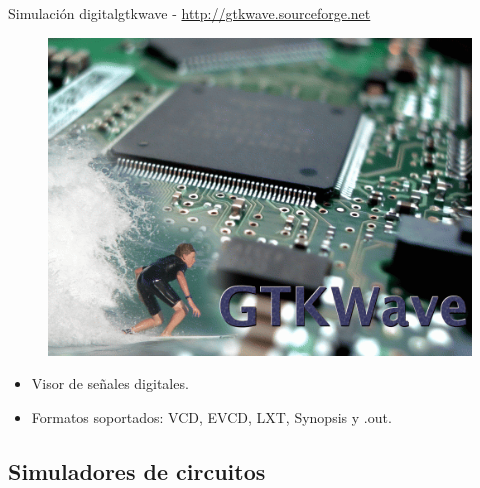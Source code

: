 \documentclass{beamer}
\begin{document}
\begin{frame}{Simulación digital}{\alert{gtkwave} - \url{http://gtkwave.sourceforge.net}}
  \begin{figure}[!h]
    \centering
    \includegraphics[scale=0.25]{img/gtkwave.png}
  \end{figure}
  \begin{itemize}
  \item Visor de señales digitales.
  \item Formatos soportados: VCD, EVCD,	LXT, Synopsis y .out.
  \end{itemize}
\end{frame}


\subsection[Simuladores de circuitos]{Simuladores de circuitos}
\end{document}

